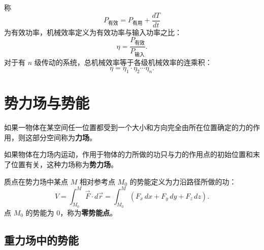 称
\begin{equation}\label{eq:13-P-effective}
  P_{\text{有效}}=P_{\text{有用}}+\frac{dT}{dt}
\end{equation}
为有效功率，机械效率定义为有效功率与输入功率之比：
\begin{equation}\label{eq:13-eta-def}
  \eta=\frac{P_{\text{有效}}}{P_{\text{输入}}}.
\end{equation}
对于有 $n$ 级传动的系统，总机械效率等于各级机械效率的连乘积：
\begin{equation}\label{eq:13-eta-multi}
  \eta=\eta_1\cdot\eta_2\cdots\eta_n .
\end{equation}

\section{势力场与势能}

\begin{definition}[力场]
如果一物体在某空间任一位置都受到一个大小和方向完全由所在位置确定的力的作用，则这部分空间称为\textbf{力场}。
\end{definition}

\begin{definition}[势力场]
如果物体在力场内运动，作用于物体的力所做的功只与力的作用点的初始位置和末了位置有关，这种力场称为\textbf{势力场}。
\end{definition}

\begin{definition}[势能]
质点在势力场中某点 $M$ 相对参考点 $M_0$ 的势能定义为力沿路径所做的功：
\begin{equation}\label{eq:13-potential-def}
  V=\int_{M_0}^{M}\vec{F}\cdot d\vec{r}
   =\int_{M_0}^{M}\left(F_x\,dx+F_y\,dy+F_z\,dz\right).
\end{equation}
点 $M_0$ 的势能为 $0$，称为\textbf{零势能点}。
\end{definition}

\subsection{重力场中的势能}

